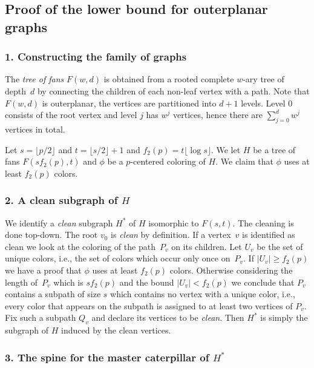 \documentclass[11pt]{article}
\begin{document}
\subsection{Proof of the lower bound for outerplanar graphs}\hfill

\subsubsection*{1.  Constructing the family of graphs}\hfill

The \emph{tree of fans} $F(w,d)$ is obtained from a rooted complete
$w$-ary tree of depth~$d$ by connecting the children of each non-leaf 
vertex with a path. Note that $F(w,d)$ is outerplanar, the vertices
are partitioned into $d+1$ levels. Level 0 consists of the root vertex and
level $j$ has $w^j$ vertices, hence there are $\sum_{j=0}^d w^j$ vertices in total.

Let $s=\lfloor p/2\rfloor$ and $t = \lfloor s/2 \rfloor +1$ and
$f_2(p) = t\lfloor\log s\rfloor$.  We let $H$ be a tree of fans $F( s f_2(p), t )$ and
$\phi$ be a $p$-centered coloring of $H$. We claim that $\phi$ uses at
least $f_2(p)$ colors.

\subsubsection*{2.  A clean subgraph of $H$}\hfill

We identify a \emph{clean} subgraph $H^*$ of $H$ isomorphic to $F(s,t)$. 
The cleaning is done top-down. The root $v_0$ is
\emph{clean} by definition. If a vertex~$v$ is identified as clean we look at
the coloring of the path~$P_v$ on its children.  Let $U_v$ be the set of
unique colors, i.e., the set of colors which occur only once on~$P_v$.  If
$|U_v| \geq f_2(p)$ we have a proof that $\phi$ uses at least $f_2(p)$
colors. Otherwise considering the length of~$P_v$ which is $s f_2(p)$ and the
bound $|U_v|<f_2(p)$ we conclude that $P_v$ contains a subpath of size $s$
which contains no vertex with a unique color, i.e., every color that appears
on the subpath is assigned to at least two vertices of $P_v$. Fix such a
subpath $Q_v$ and declare its vertices to be \emph{clean}.  Then $H^*$ is
simply the subgraph of $H$ induced by the clean vertices.

\subsubsection*{3.  The spine for the master caterpillar of $H^*$}\hfill
\end{document}
